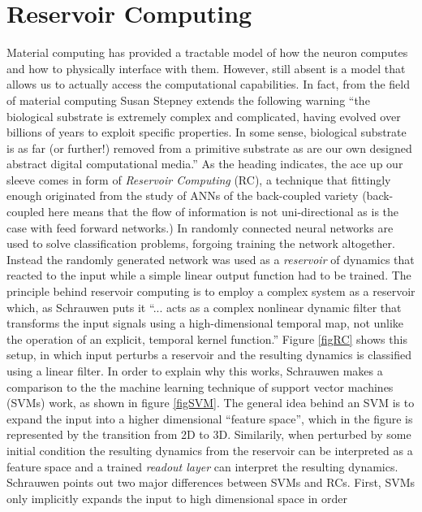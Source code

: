 \section{Reservoir Computing}
Material computing has provided a tractable model of how the neuron computes and
how to physically interface with them.
However, still absent is a model that allows us to actually access the
computational capabilities.
In fact, from the field of material computing Susan Stepney extends the
following warning ``the biological substrate is extremely complex and
complicated, having evolved over billions of years to exploit specific
properties. In some sense, biological substrate is as far (or further!) removed
from a primitive substrate as are our own designed abstract digital
computational media.''
%
As the heading indicates, the ace up our sleeve comes in form of \emph{Reservoir
  Computing} (RC), a technique that fittingly enough originated from the study of
ANNs of the back-coupled variety\cite{JAEGER}\cite{MAASS02}
(back-coupled here means that the flow of information is not uni-directional as
is the case with feed forward networks.)
In \cite{JAEGER} randomly connected neural networks are used to solve
classification problems, forgoing training the network altogether.
Instead the randomly generated network was used as a \emph{reservoir} of
dynamics that reacted to the input while a simple linear output function had to
be trained.
The principle behind reservoir computing is to employ a complex system as a
reservoir which, as Schrauwen puts it \cite{Schrauwen2007} ``... acts
as a complex nonlinear dynamic filter that transforms the input signals using a
high-dimensional temporal map, not unlike the operation of an explicit, temporal
kernel function.''
Figure \ref{figRC} shows this setup, in which input perturbs a reservoir and the
resulting dynamics is classified using a linear filter.
%
In order to explain why this works, Schrauwen makes a comparison to the the
machine learning technique of support vector machines (SVMs) work, as shown in figure
\ref{figSVM}.
The general idea behind an SVM is to expand the input into a higher dimensional
``feature space'', which in the figure is represented by the transition from 2D
to 3D.
Similarily, when perturbed by some initial condition the resulting dynamics from
the reservoir can be interpreted as a feature space and a trained \emph{readout
layer} can interpret the resulting dynamics.
Schrauwen points out two major differences between SVMs and RCs.
First, SVMs only implicitly expands the input to high dimensional space in order
